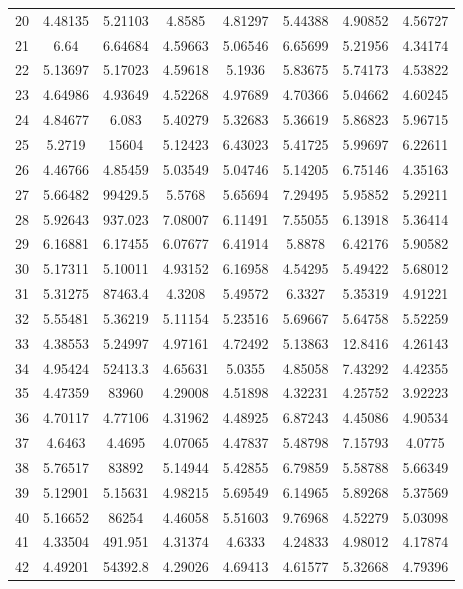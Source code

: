 \begin{figure}
\begin{tabular}{cccccccc}
20 & 4.48135 & 5.21103 & 4.8585 & 4.81297 & 5.44388 & 4.90852 & 4.56727\\
21 & 6.64 & 6.64684 & 4.59663 & 5.06546 & 6.65699 & 5.21956 & 4.34174\\
22 & 5.13697 & 5.17023 & 4.59618 & 5.1936 & 5.83675 & 5.74173 & 4.53822\\
23 & 4.64986 & 4.93649 & 4.52268 & 4.97689 & 4.70366 & 5.04662 & 4.60245\\
24 & 4.84677 & 6.083 & 5.40279 & 5.32683 & 5.36619 & 5.86823 & 5.96715\\
25 & 5.2719 & 15604 & 5.12423 & 6.43023 & 5.41725 & 5.99697 & 6.22611\\
26 & 4.46766 & 4.85459 & 5.03549 & 5.04746 & 5.14205 & 6.75146 & 4.35163\\
27 & 5.66482 & 99429.5 & 5.5768 & 5.65694 & 7.29495 & 5.95852 & 5.29211\\
28 & 5.92643 & 937.023 & 7.08007 & 6.11491 & 7.55055 & 6.13918 & 5.36414\\
29 & 6.16881 & 6.17455 & 6.07677 & 6.41914 & 5.8878 & 6.42176 & 5.90582\\
30 & 5.17311 & 5.10011 & 4.93152 & 6.16958 & 4.54295 & 5.49422 & 5.68012\\
31 & 5.31275 & 87463.4 & 4.3208 & 5.49572 & 6.3327 & 5.35319 & 4.91221\\
32 & 5.55481 & 5.36219 & 5.11154 & 5.23516 & 5.69667 & 5.64758 & 5.52259\\
33 & 4.38553 & 5.24997 & 4.97161 & 4.72492 & 5.13863 & 12.8416 & 4.26143\\
34 & 4.95424 & 52413.3 & 4.65631 & 5.0355 & 4.85058 & 7.43292 & 4.42355\\
35 & 4.47359 & 83960 & 4.29008 & 4.51898 & 4.32231 & 4.25752 & 3.92223\\
36 & 4.70117 & 4.77106 & 4.31962 & 4.48925 & 6.87243 & 4.45086 & 4.90534\\
37 & 4.6463 & 4.4695 & 4.07065 & 4.47837 & 5.48798 & 7.15793 & 4.0775\\
38 & 5.76517 & 83892 & 5.14944 & 5.42855 & 6.79859 & 5.58788 & 5.66349\\
39 & 5.12901 & 5.15631 & 4.98215 & 5.69549 & 6.14965 & 5.89268 & 5.37569\\
40 & 5.16652 & 86254 & 4.46058 & 5.51603 & 9.76968 & 4.52279 & 5.03098\\
41 & 4.33504 & 491.951 & 4.31374 & 4.6333 & 4.24833 & 4.98012 & 4.17874\\
42 & 4.49201 & 54392.8 & 4.29026 & 4.69413 & 4.61577 & 5.32668 & 4.79396\\

\end{tabular}
\end{figure}
